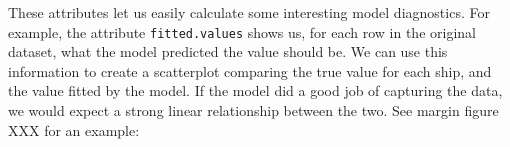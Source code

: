 \documentclass{tufte-book}\usepackage[]{graphicx}\usepackage[]{color}
\makeatletter
\def\maxwidth{ %
  \ifdim\Gin@nat@width>\linewidth
    \linewidth
  \else
    \Gin@nat@width
  \fi
}
\newcommand{\hlnum}[1]{\textcolor[rgb]{0.686,0.059,0.569}{#1}}%
\newcommand{\hlstr}[1]{\textcolor[rgb]{0.192,0.494,0.8}{#1}}%
\newcommand{\hlcom}[1]{\textcolor[rgb]{0.678,0.584,0.686}{\textit{#1}}}%
\newcommand{\hlopt}[1]{\textcolor[rgb]{0,0,0}{#1}}%
\newcommand{\hlstd}[1]{\textcolor[rgb]{0.345,0.345,0.345}{#1}}%
\newcommand{\hlkwc}[1]{\textcolor[rgb]{0.333,0.667,0.333}{#1}}%
\newcommand{\hlkwd}[1]{\textcolor[rgb]{0.737,0.353,0.396}{\textbf{#1}}}%
\newenvironment{kframe}{%
 \def\at@end@of@kframe{}%
 \ifinner\ifhmode%
  \def\at@end@of@kframe{\end{minipage}}%
  \begin{minipage}{\columnwidth}%
 \fi\fi%
 \def\FrameCommand##1{\hskip\@totalleftmargin \hskip-\fboxsep
 \colorbox{shadecolor}{##1}\hskip-\fboxsep
     \hskip-\linewidth \hskip-\@totalleftmargin \hskip\columnwidth}%
 \MakeFramed {\advance\hsize-\width
   \@totalleftmargin\z@ \linewidth\hsize
   \@setminipage}}%
 {\par\unskip\endMakeFramed%
 \at@end@of@kframe}
\newenvironment{knitrout}{}{} %
\makeatother
\begin{document}
\begin{footnotesize}
These attributes let us easily calculate some interesting model diagnostics. For example, the attribute \texttt{fitted.values} shows us, for each row in the original dataset, what the model predicted the value should be. We can use this information to create a scatterplot comparing the true value for each ship, and the value fitted by the model. If the model did a good job of capturing the data, we would expect a strong linear relationship between the two. See margin figure XXX for an example:

\end{footnotesize}
\end{document}
